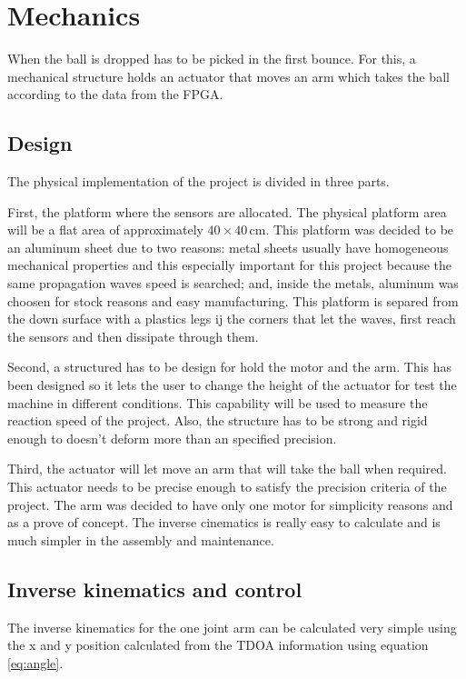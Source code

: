 \chapter{Mechanics} %
\label{cha:Mechanics}
	When the ball is dropped has to be picked in the first bounce. 
	For this, a mechanical structure holds an actuator that moves an arm which takes the ball according to the data from the FPGA.

	\section{Design} %
	\label{sec:design}
		The physical implementation of the project is divided in three parts.

		First, the platform where the sensors are allocated. 
		The physical platform area will be a flat area of approximately $40\times40\,\si{\centi\meter}$.
		This platform was decided to be an aluminum sheet due to two reasons: metal sheets usually have homogeneous mechanical properties and this especially important for this project because the same propagation waves speed is searched; and, inside the metals, aluminum was choosen for stock reasons and easy manufacturing. 
		This platform is separed from the down surface with a plastics legs ij the corners that let the waves, first reach the sensors and then dissipate through them.

		Second, a structured has to be design for hold the motor and the arm. 
		This has been designed so it lets the user to change the height of the actuator for test the machine in different conditions. 
		This capability will be used to measure the reaction speed of the project. 
		Also, the structure has to be strong and rigid enough to doesn't deform more than an specified precision.

		Third, the actuator will let move an arm that will take the ball when required. 
		This actuator needs to be precise enough to satisfy the precision criteria of the project. 
		The arm was decided to have only one motor for simplicity reasons and as a prove of concept. 
		The inverse cinematics is really easy to calculate and is much simpler in the assembly and maintenance.
			

	\section{Inverse kinematics and control }
	\label{sec:kinematics}
		The inverse kinematics for the one joint arm can be calculated very simple using the x and y position calculated from the TDOA information using equation \ref{eq:angle}.

